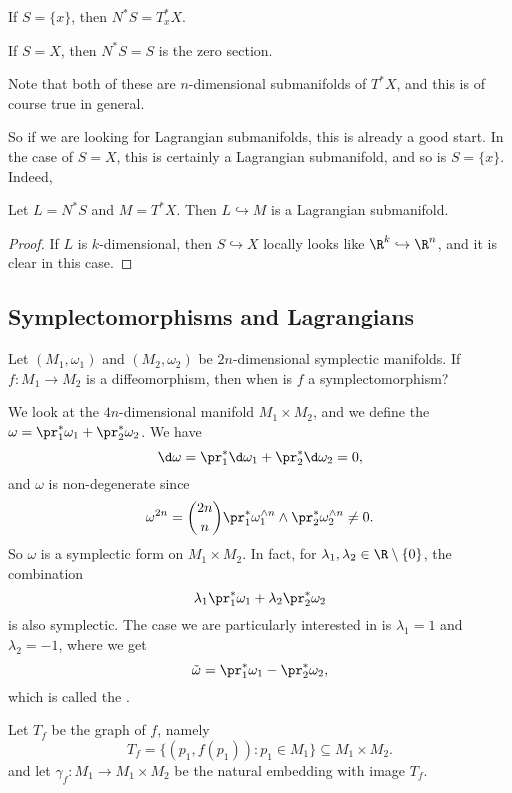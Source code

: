 \documentclass[a4paper]{article}
\begin{document}
\begin{eg}
  If $S = \{x\}$, then $N^*S = T^*_x X$.
\end{eg}

\begin{eg}
  If $S = X$, then $N^*S = S$ is the zero section.
\end{eg}

Note that both of these are $n$-dimensional submanifolds of $T^*X$, and this is of course true in general.

So if we are looking for Lagrangian submanifolds, this is already a good start. In the case of $S = X$, this is certainly a Lagrangian submanifold, and so is $S = \{x\}$. Indeed,
\begin{prop}
  Let $L = N^* S$ and $M = T^* X$. Then $L \hookrightarrow M$ is a Lagrangian submanifold.
\end{prop}

\begin{proof}
  If $L$ is $k$-dimensional, then $S \hookrightarrow X$ locally looks like $\R^k \hookrightarrow \R^n$, and it is clear in this case.
\end{proof}

\subsection{Symplectomorphisms and Lagrangians}
Let $(M_1, \omega_1)$ and $(M_2, \omega_2)$ be $2n$-dimensional symplectic manifolds. If $f: M_1 \to M_2$ is a diffeomorphism, then when is $f$ a symplectomorphism?

We look at the $4n$-dimensional manifold $M_1 \times M_2$, and we define the  $\omega = \pr_1^* \omega_1 + \pr_2^* \omega_2$. We have
\[
  \d \omega = \pr_1^* \d \omega_1 + \pr_2^* \d \omega_2 = 0,
\]
and $\omega$ is non-degenerate since
\[
  \omega^{2n} = \binom{2n}{n} \pr_1^* \omega_1^{\wedge n} \wedge \pr_2^* \omega_2^{\wedge n} \not= 0.
\]
So $\omega$ is a symplectic form on $M_1 \times M_2$. In fact, for $\lambda_1, \lambda_2 \in \R \setminus \{0\}$, the combination
\[
  \lambda_1 \pr_1^* \omega_1 + \lambda_2 \pr_2^* \omega_2
\]
is also symplectic. The case we are particularly interested in is $\lambda_1 = 1$ and $\lambda_2 = -1$, where we get
\[
  \tilde{\omega} = \pr_1^* \omega_1 - \pr_2^* \omega_2,
\]
which is called the \index{$\tilde{\omega}$}.

Let $T_f$ be the graph of $f$, namely
\[
  T_f = \{(p_1, f(p_1)) : p_1 \in M_1\} \subseteq M_1 \times M_2.
\]
and let $\gamma_f: M_1 \to M_1 \times M_2$ be the natural embedding with image $T_f$.
\end{document}
